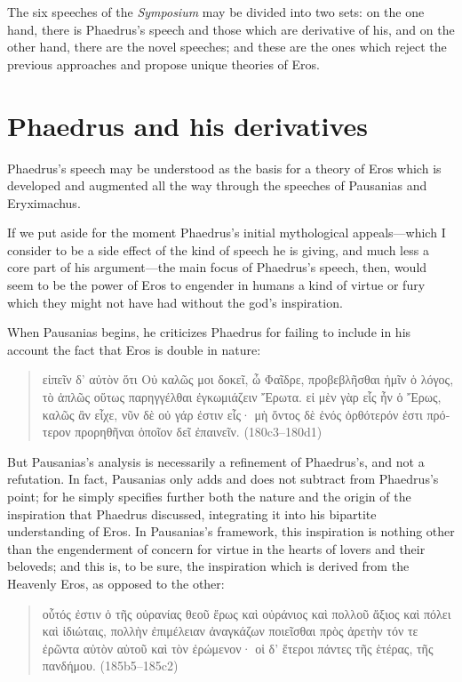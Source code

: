 The six speeches of the \emph{Symposium} may be divided into two sets:
on the one hand, there is Phaedrus's speech and those which are
derivative of his, and on the other hand, there are the novel speeches;
and these are the ones which reject the previous approaches and propose
unique theories of Eros.

\section{Phaedrus and his derivatives}

Phaedrus's speech may be understood as the basis for a theory of Eros
which is developed and augmented all the way through the speeches of
Pausanias and Eryximachus.

If we put aside for the moment Phaedrus's initial mythological
appeals---which I consider to be a side effect of the kind of speech he
is giving, and much less a core part of his argument---the main focus of
Phaedrus's speech, then, would seem to be the power of Eros to engender
in humans a kind of virtue or fury which they might not have had without
the god's inspiration.

When Pausanias begins, he criticizes Phaedrus for failing to include in
his account the fact that Eros is double in nature:

\begin{quote}
\textgreek{εἰπεῖν δ' αὐτὸν ὅτι Οὐ καλῶς μοι δοκεῖ, ὦ Φαῖδρε,
προβεβλῆσθαι ἡμῖν ὁ λόγος, τὸ ἁπλῶς οὕτως παρηγγέλθαι ἐγκωμιάζειν
Ἔρωτα. εἰ μὲν γὰρ εἷς ἦν ὁ Ἔρως, καλῶς ἂν εἶχε, νῦν δὲ οὐ γάρ ἐστιν
εἷς· μὴ ὄντος δὲ ἑνός ὀρθότερόν ἐστι πρότερον προρηθῆναι ὁποῖον δεῖ
ἐπαινεῖν.} (180c3--180d1)
\end{quote}

But Pausanias's analysis is necessarily a refinement of Phaedrus's, and
not a refutation. In fact, Pausanias only adds and does not subtract
from Phaedrus's point; for he simply specifies further both the nature
and the origin of the inspiration that Phaedrus discussed, integrating
it into his bipartite understanding of Eros. In Pausanias's framework,
this inspiration is nothing other than the engenderment of concern for
virtue in the hearts of lovers and their beloveds; and this is, to be
sure, the inspiration which is derived from the Heavenly Eros, as
opposed to the other:

\begin{quote}
\textgreek{οὗτός ἐστιν ὁ τῆς οὐρανίας θεοῦ ἔρως καὶ οὐράνιος καὶ
πολλοῦ ἄξιος καὶ πόλει καὶ ἰδιώταις, πολλὴν ἐπιμέλειαν ἀναγκάζων
ποιεῖσθαι πρὸς ἀρετὴν τόν τε ἐρῶντα αὐτὸν αὑτοῦ καὶ τὸν ἐρώμενον· οἱ
δ' ἕτεροι πάντες τῆς ἑτέρας, τῆς πανδήμου.} (185b5--185c2)
\end{quote}

